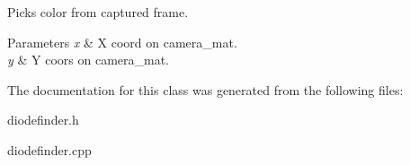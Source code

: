 \-Picks color from captured frame. 


\begin{DoxyParams}{\-Parameters}
{\em x} & \-X coord on camera\-\_\-mat. \\
\hline
{\em y} & \-Y coors on camera\-\_\-mat. \\
\hline
\end{DoxyParams}


\-The documentation for this class was generated from the following files\-:\begin{DoxyCompactItemize}
\item 
diodefinder.\-h\item 
diodefinder.\-cpp\end{DoxyCompactItemize}
